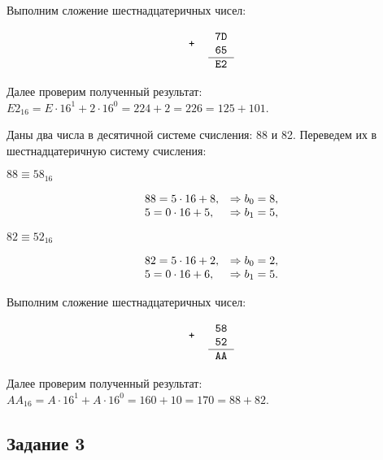\documentclass[a4paper,14pt]{extarticle}
\begin{document}
	Выполним сложение шестнадцатеричных чисел:
	
	\[
	\begin{tabular}{{c}{c}}
		\texttt{+} &
		\begin{tabular}{c}
			\texttt{7D}\\
			\texttt{65}\\
			\hline
		\end{tabular}\\
		& \texttt{E2}
	\end{tabular}
	\]
	
	Далее проверим полученный результат:\\
	$E2_{16}=E \cdot 16^{1} + 2 \cdot 16^{0}=224+2=226=125+101$.
	
	Даны два числа в десятичной системе счисления: 88 и 82. Переведем их в шестнадцатеричную систему счисления:
	
	$88 \equiv 58_{16}$
	
	\[
	\begin{array}[c]{ll}
		88 = 5 \cdot 16 + 8, &\Rightarrow b_{0} = 8,\\
		5 = 0 \cdot 16 + 5, &\Rightarrow b_{1} = 5,\\
	\end{array}
	\]
	
	$82 \equiv 52_{16}$
	
	\[
	\begin{array}[c]{ll}
		82 = 5 \cdot 16 + 2, &\Rightarrow b_{0} = 2,\\
		5 = 0 \cdot 16 + 6, &\Rightarrow b_{1} = 5.\\
	\end{array}
	\]
	
	Выполним сложение шестнадцатеричных чисел:
	
	\[
	\begin{tabular}{{c}{c}}
		\texttt{+} &
		\begin{tabular}{c}
			\texttt{58}\\
			\texttt{52}\\
			\hline
		\end{tabular}\\
		& \texttt{AA}
	\end{tabular}
	\]
	
	Далее проверим полученный результат:\\
	$AA_{16}=A \cdot 16^{1} + A \cdot 16^{0}=160+10=170=88+82$.
	
	\pagebreak
	
	\subsection*{Задание 3}
	
\end{document}
